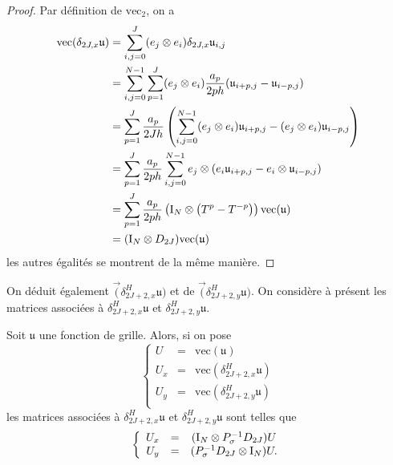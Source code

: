 \begin{proof}
Par définition de $\text{vec}_2$, on a 
\begin{align*}
\text{vec} (\delta_{2J,x} \mathfrak{u}) & = \displaystyle\sum\limits_{i,j=0}^J (e_j \otimes e_i) \delta_{2J,x} \mathfrak{u}_{i,j} \\
	& = \displaystyle\sum\limits_{i,j=0}^{N-1} \displaystyle\sum\limits_{p=1}^J (e_j \otimes e_i) \dfrac{a_p}{2ph} (\mathfrak{u}_{i+p,j} - \mathfrak{u}_{i-p,j}) \\
	& = \displaystyle\sum\limits_{p=1}^J \dfrac{a_p}{2Jh} \left( \displaystyle\sum\limits_{i,j=0}^{N-1} (e_j \otimes e_i) \mathfrak{u}_{i+p,j} - (e_j \otimes e_i) \mathfrak{u}_{i-p,j} \right) \\
	& = \displaystyle\sum\limits_{p=1}^J \dfrac{a_p}{2ph} \displaystyle\sum\limits_{i,j=0}^{N-1} e_j \otimes (e_i \mathfrak{u}_{i+p,j} - e_i \otimes \mathfrak{u}_{i-p,j})\\
	& = \displaystyle\sum\limits_{p=1}^J \dfrac{a_p}{2ph} \left( \text{I}_N \otimes \left( T^p - T^{-p}  \right) \right) \text{vec} (\mathfrak{u}) \\
	& = (\text{I}_N \otimes D_{2J}) \text{vec} (\mathfrak{u})
\end{align*}
les autres égalités se montrent de la même manière.
\end{proof}
On déduit également $\vec(\delta_{2J+2,x}^H \mathfrak{u})$ et de $\vec(\delta_{2J+2,y}^H \mathfrak{u})$.
On considère à présent les matrices associées à $\delta^H_{2J+2,x} \mathfrak{u}$ et $\delta^H_{2J+2,y} \mathfrak{u}$.
\begin{theoreme}
Soit $\mathfrak{u}$ une fonction de grille. Alors, si on pose 
\begin{equation}
\left\lbrace
\begin{array}{rcl}
U & = & \text{vec} (\mathfrak{u}) \\
U_x & = & \text{vec} (\delta_{2J+2,x}^H \mathfrak{u}) \\
U_y & = & \text{vec} (\delta_{2J+2,y}^H \mathfrak{u}) \\
\end{array}
\right.
\end{equation}
les matrices associées à $\delta^H_{2J+2,x} \mathfrak{u}$ et $\delta^H_{2J+2,y} \mathfrak{u}$ sont telles que 
\begin{equation}
\left\lbrace
\begin{array}{rcccl}
U_x &=& (\text{I}_N \otimes P^{-1}_{\sigma} D_{2J})U \\
U_y &=& (P^{-1}_{\sigma}D_{2J} \otimes \text{I}_N)U.
\end{array}
\right.
\end{equation}
\end{theoreme}

